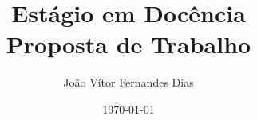 \documentclass[12pt, a4paper]{article}
\title{\textbf{Estágio em Docência \\ Proposta de Trabalho}}
\author{João Vítor Fernandes Dias}
\date{\today}
\begin{document}
\begin{comment}

## Moodle

- Enviar a proposta de trabalho no formato PDF pelo Moodle com o nome `<NomeDoAluno>.pdf`
- Ao enviar a proposta, o aluno deve também encaminhar uma mensagem ao coordenador da disciplina por e-mail, incluindo o professor responsável pela disciplina em cópia, de modo a informá-lo da submissão da proposta. A proposta de trabalho será avaliada pelo coordenador da disciplina, compondo a nota final da disciplina ED I/II.

===

## Diretrizes Gerais:

4. Proposta de trabalho: é definida uma data para que o estagiário encaminhe uma proposta de trabalho ao coordenador da disciplina, em que conste também o tipo de atividade a ser conduzida, em comum acordo com o professor responsável pela turma à qual foi alocado.

---

A proposta de trabalho deverá ser previamente acertada com o professor responsável pela turma à qual o estagiário foi alocado, e submetida no Moodle da disciplina em um arquivo PDF (usar o nome NomeCompletoDoAluno.pdf).

A proposta deve conter os seguintes itens:

1. Identificação: Título, Disciplina, Professor responsável pela turma
2. Sobre a Disciplina: Descrição da forma de condução da disciplina adotada pelo professor responsável. Ementa e programa da disciplina. Bibliografia adotada. Formas de avaliação.
3. Atividades: Indicação das atividades e tarefas que ficarão sob a responsabilidade do estagiário.
4. Cronograma: Cronograma de aulas e avaliações, indicando a participação do estagiário ao longo do tempo.

Ao enviar a proposta, o aluno deve também encaminhar uma mensagem ao coordenador da disciplina por e-mail, incluindo o professor responsável pela disciplina em cópia, de modo a informá-lo da submissão da proposta.

A proposta de trabalho será avaliada pelo coordenador da disciplina, compondo a nota final da disciplina ED I/II.

---

### Critérios de Avaliação

A avaliação será feita considerando o planejamento e as atividades realizadas ao longo do semestre. Os critérios são os seguintes:

- Proposta de trabalho: 50 pontos (coordenador da disciplina ED)
  - Conhecimento da disciplina apoiada
  - Planejamento das atividades
  - Atendimento ao conteúdo previsto
\end{comment}
\end{document}
